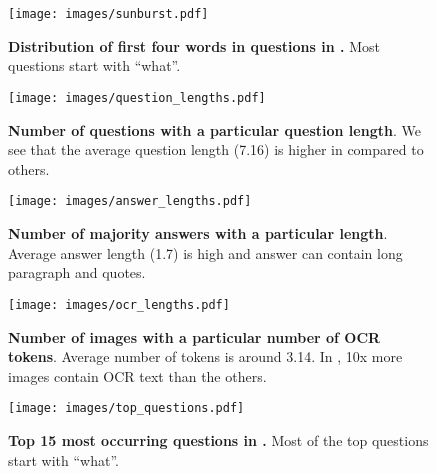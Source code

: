 \documentclass[10pt,twocolumn,letterpaper]{article}
\begin{document}
\section{\protect{}}
\begin{figure}
    \centering
    \texttt{[image: images/sunburst.pdf]}
    \vspace{-30pt}
    \caption{\textbf{Distribution of first four words in questions in \datasetName.} Most questions start with ``what''. }
    \label{fig:sunburst}
    \vspace{-5pt}
\end{figure}

\begin{figure*}
    \centering
    \begin{subfigure}[t]{0.32\textwidth}
        \texttt{[image: images/question\_lengths.pdf]}
        \caption{\textbf{Number of questions with a particular question length}. 
        We see that the average question length (7.16) is higher in \datasetName compared to others.}
        \label{fig:question_lengths}
    \end{subfigure}
    \hspace{1mm}
    \begin{subfigure}[t]{0.32\textwidth}
        \texttt{[image: images/answer\_lengths.pdf]}
        \caption{\textbf{Number of majority answers with a particular length}. Average answer length (1.7) is high and answer can contain long paragraph and quotes.}
        \label{fig:answer_lengths}
    \end{subfigure}
    \hspace{1mm}
    \begin{subfigure}[t]{0.32\textwidth}
        \texttt{[image: images/ocr\_lengths.pdf]}
        \caption{\textbf{Number of images with a particular number of OCR tokens}. Average number of tokens is around 3.14. In \datasetName, 10x more images contain OCR text than the others.}
        \label{fig:ocr_lengths}
    \end{subfigure}
    \begin{subfigure}[t]{0.32\textwidth}
        \texttt{[image: images/top\_questions.pdf]}
        \caption{
        \textbf{Top 15 most occurring questions in \datasetName.} Most of the top questions start with ``what''.}
        \label{fig:question_count}
    \end{subfigure}
    \hspace{1mm}

\end{figure*}
\end{document}
